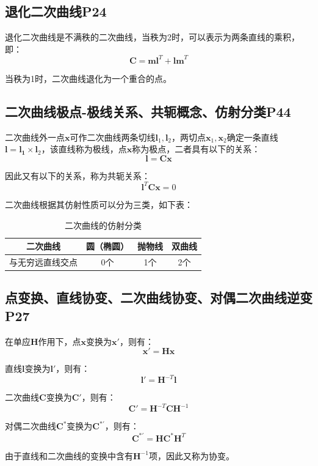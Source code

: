 \documentclass[11pt]{article}
\begin{document}
\subsection{退化二次曲线P24}
退化二次曲线是不满秩的二次曲线，当秩为2时，可以表示为两条直线的乘积，即：
\begin{equation*}
  \mathbf{C}=\mathbf{ml}^T+\mathbf{lm}^T
\end{equation*}\par
当秩为1时，二次曲线退化为一个重合的点。
\subsection{二次曲线极点-极线关系、共轭概念、仿射分类P44}
二次曲线外一点$\mathbf{x}$可作二次曲线两条切线$\mathbf{l}_1,\mathbf{l}_2$，两切点$\mathbf{x}_1,\mathbf{x}_2$确定一条直线$\mathbf{l}=\mathbf{l_1}\times\mathbf{l}_2$，该直线称为极线，点$\mathbf{x}$称为极点，二者具有以下的关系：
\begin{equation*}
  \mathbf{l}=\mathbf{Cx}
\end{equation*}\par
因此又有以下的关系，称为共轭关系：
\begin{equation*}
  \mathbf{l}^T\mathbf{C}\mathbf{x}=0
\end{equation*}\par
二次曲线根据其仿射性质可以分为三类，如下表：
\begin{table}[H]
  \centering
  \caption{二次曲线的仿射分类}
  \begin{tabular}{|c|c|c|c|}
    \hline
    二次曲线 & 圆（椭圆） & 抛物线 & 双曲线 \\
    \hline
    与无穷远直线交点 & 0个 & 1个 & 2个 \\
    \hline
  \end{tabular}
\end{table}
\subsection{点变换、直线协变、二次曲线协变、对偶二次曲线逆变P27}
在单应$\mathbf{H}$作用下，点$\mathbf{x}$变换为$\mathbf{x}'$，则有：
\begin{equation*}
  \mathbf{x}'=\mathbf{Hx} 
\end{equation*}\par
直线$\mathbf{l}$变换为$\mathbf{l}'$，则有：
\begin{equation*}
  \mathbf{l}'=\mathbf{H}^{-T}\mathbf{l}
\end{equation*}\par
二次曲线$\mathbf{C}$变换为$\mathbf{C}'$，则有：
\begin{equation*}
  \mathbf{C}'=\mathbf{H}^{-T}\mathbf{CH}^{-1}
\end{equation*}\par
对偶二次曲线$\mathbf{C}^*$变换为$\mathbf{C}^{*'}$，则有：
\begin{equation*}
  \mathbf{C}^{*'}=\mathbf{HC}^*\mathbf{H}^T
\end{equation*}\par
由于直线和二次曲线的变换中含有$\mathbf{H}^{-1}$项，因此又称为协变。
\end{document}
